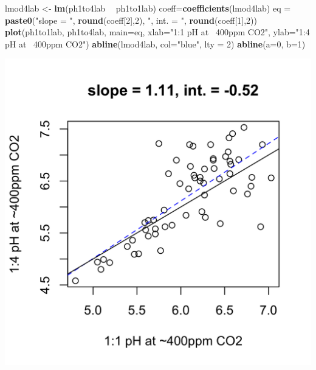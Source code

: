 \documentclass[]{article}
\newenvironment{Shaded}{\begin{snugshade}}{\end{snugshade}}
\newcommand{\DataTypeTok}[1]{\textcolor[rgb]{0.13,0.29,0.53}{#1}}
\newcommand{\DecValTok}[1]{\textcolor[rgb]{0.00,0.00,0.81}{#1}}
\newcommand{\KeywordTok}[1]{\textcolor[rgb]{0.13,0.29,0.53}{\textbf{#1}}}
\newcommand{\NormalTok}[1]{#1}
\newcommand{\OperatorTok}[1]{\textcolor[rgb]{0.81,0.36,0.00}{\textbf{#1}}}
\newcommand{\StringTok}[1]{\textcolor[rgb]{0.31,0.60,0.02}{#1}}
\begin{document}
\begin{Shaded}
\begin{Highlighting}[]
\NormalTok{lmod4lab <-}\StringTok{ }\KeywordTok{lm}\NormalTok{(ph1to4lab }\OperatorTok{~}\StringTok{ }\NormalTok{ph1to1lab)}
\NormalTok{coeff=}\KeywordTok{coefficients}\NormalTok{(lmod4lab)}
\NormalTok{eq =}\StringTok{ }\KeywordTok{paste0}\NormalTok{(}\StringTok{"slope = "}\NormalTok{, }\KeywordTok{round}\NormalTok{(coeff[}\DecValTok{2}\NormalTok{],}\DecValTok{2}\NormalTok{), }\StringTok{", int. = "}\NormalTok{, }\KeywordTok{round}\NormalTok{(coeff[}\DecValTok{1}\NormalTok{],}\DecValTok{2}\NormalTok{))}
\KeywordTok{plot}\NormalTok{(ph1to1lab, ph1to4lab, }\DataTypeTok{main=}\NormalTok{eq,}
   \DataTypeTok{xlab=}\StringTok{"1:1 pH at ~400ppm CO2"}\NormalTok{, }\DataTypeTok{ylab=}\StringTok{"1:4 pH at ~400ppm CO2"}\NormalTok{)}
\KeywordTok{abline}\NormalTok{(lmod4lab, }\DataTypeTok{col=}\StringTok{"blue"}\NormalTok{, }\DataTypeTok{lty =} \DecValTok{2}\NormalTok{)}
\KeywordTok{abline}\NormalTok{(}\DataTypeTok{a=}\DecValTok{0}\NormalTok{, }\DataTypeTok{b=}\DecValTok{1}\NormalTok{)}
\end{Highlighting}
\end{Shaded}

\includegraphics{output-rmd/whitman-figure-request-4-lab-spooner-1.png}
\end{document}
